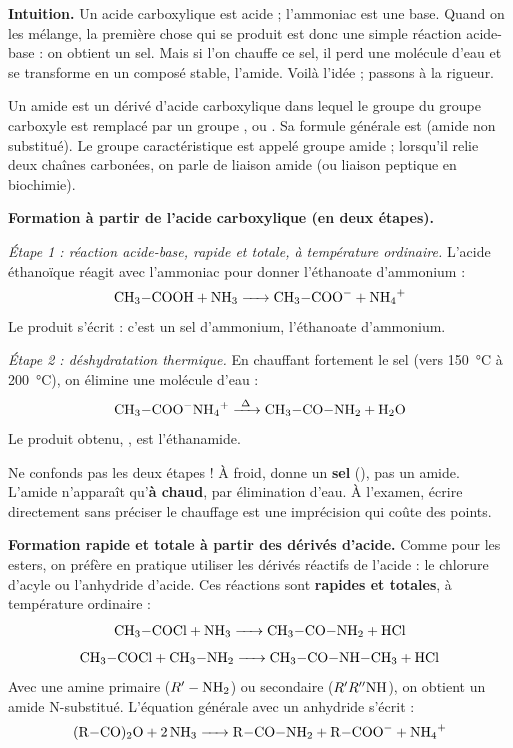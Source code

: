 \documentclass[11pt]{article}
\newcommand{\cle}[1]{{\popxbold\color{popdark}#1}}
\newcounter{popsec}
\newcounter{popsub}
\newcommand{\courssub}[1]{%
  \stepcounter{popsub}%
  \par\vspace{9pt}\noindent{\popxbold\fontsize{11.5}{13}\selectfont\color{popink}{\color{poporange}\thepopsec.\thepopsub}\hspace{6pt}#1}\par\nopagebreak\vspace{4pt}
}
\begin{document}
\courssub{Les amides : formation et nomenclature}

\textbf{Intuition.} Un acide carboxylique  est acide ; l'ammoniac  est une base. Quand on les mélange, la première chose qui se produit est donc une simple réaction acide-base : on obtient un sel. Mais si l'on chauffe ce sel, il perd une molécule d'eau et se transforme en un composé stable, l'amide. Voilà l'idée ; passons à la rigueur.

\begin{definition}[Amide]
Un \cle{amide} est un dérivé d'acide carboxylique dans lequel le groupe  du groupe carboxyle est remplacé par un groupe ,  ou . Sa formule générale est  (amide non substitué). Le groupe caractéristique  est appelé \cle{groupe amide} ; lorsqu'il relie deux chaînes carbonées, on parle de \cle{liaison amide} (ou liaison peptique en biochimie).
\end{definition}

\textbf{Formation à partir de l'acide carboxylique (en deux étapes).}

\emph{Étape 1 : réaction acide-base, rapide et totale, à température ordinaire.} L'acide éthanoïque réagit avec l'ammoniac pour donner l'éthanoate d'ammonium :
\[ \ce{CH3-COOH + NH3 -> CH3-COO- + NH4+} \]
Le produit s'écrit  : c'est un sel d'ammonium, l'éthanoate d'ammonium.

\emph{Étape 2 : déshydratation thermique.} En chauffant fortement le sel (vers \SI{150}{\celsius} à \SI{200}{\celsius}), on élimine une molécule d'eau :
\[ \ce{CH3-COO^{-}NH4+ ->[\Delta] CH3-CO-NH2 + H2O} \]
Le produit obtenu, , est l'\cle{éthanamide}.

\begin{attention}
Ne confonds pas les deux étapes ! À froid,  donne un \textbf{sel} (), pas un amide. L'amide n'apparaît qu'\textbf{à chaud}, par élimination d'eau. À l'examen, écrire directement  sans préciser le chauffage est une imprécision qui coûte des points.
\end{attention}

\textbf{Formation rapide et totale à partir des dérivés d'acide.} Comme pour les esters, on préfère en pratique utiliser les dérivés réactifs de l'acide : le \cle{chlorure d'acyle} ou l'\cle{anhydride d'acide}. Ces réactions sont \textbf{rapides et totales}, à température ordinaire :
\[ \ce{CH3-COCl + NH3 -> CH3-CO-NH2 + HCl} \]
\[ \ce{CH3-COCl + CH3-NH2 -> CH3-CO-NH-CH3 + HCl} \]
Avec une amine primaire ($R'-\ce{NH2}$) ou secondaire ($R'R''\ce{NH}$), on obtient un amide \cle{N-substitué}. L'équation générale avec un anhydride s'écrit :
\[ \ce{(R-CO)2O + 2 NH3 -> R-CO-NH2 + R-COO- + NH4+} \]
\end{document}
